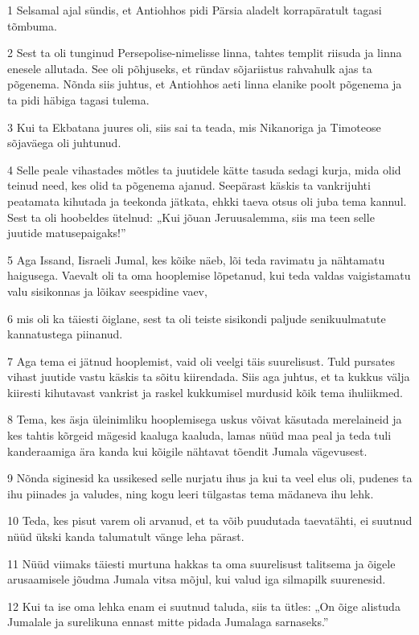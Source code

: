 \par 1 Selsamal ajal sündis, et Antiohhos pidi Pärsia aladelt korrapäratult tagasi tõmbuma.
\par 2 Sest ta oli tunginud Persepolise-nimelisse linna, tahtes templit riisuda ja linna enesele allutada. See oli põhjuseks, et ründav sõjariistus rahvahulk ajas ta põgenema. Nõnda siis juhtus, et Antiohhos aeti linna elanike poolt põgenema ja ta pidi häbiga tagasi tulema.
\par 3 Kui ta Ekbatana juures oli, siis sai ta teada, mis Nikanoriga ja Timoteose sõjaväega oli juhtunud.
\par 4 Selle peale vihastades mõtles ta juutidele kätte tasuda sedagi kurja, mida olid teinud need, kes olid ta põgenema ajanud. Seepärast käskis ta vankrijuhti peatamata kihutada ja teekonda jätkata, ehkki taeva otsus oli juba tema kannul. Sest ta oli hoobeldes ütelnud: „Kui jõuan Jeruusalemma, siis ma teen selle juutide matusepaigaks!”
\par 5 Aga Issand, Iisraeli Jumal, kes kõike näeb, lõi teda ravimatu ja nähtamatu haigusega. Vaevalt oli ta oma hooplemise lõpetanud, kui teda valdas vaigistamatu valu sisikonnas ja lõikav seespidine vaev,
\par 6 mis oli ka täiesti õiglane, sest ta oli teiste sisikondi paljude senikuulmatute kannatustega piinanud.
\par 7 Aga tema ei jätnud hooplemist, vaid oli veelgi täis suurelisust. Tuld pursates vihast juutide vastu käskis ta sõitu kiirendada. Siis aga juhtus, et ta kukkus välja kiiresti kihutavast vankrist ja raskel kukkumisel murdusid kõik tema ihuliikmed.
\par 8 Tema, kes äsja üleinimliku hooplemisega uskus võivat käsutada merelaineid ja kes tahtis kõrgeid mägesid kaaluga kaaluda, lamas nüüd maa peal ja teda tuli kanderaamiga ära kanda kui kõigile nähtavat tõendit Jumala vägevusest.
\par 9 Nõnda siginesid ka ussikesed selle nurjatu ihus ja kui ta veel elus oli, pudenes ta ihu piinades ja valudes, ning kogu leeri tülgastas tema mädaneva ihu lehk.
\par 10 Teda, kes pisut varem oli arvanud, et ta võib puudutada taevatähti, ei suutnud nüüd ükski kanda talumatult vänge leha pärast.
\par 11 Nüüd viimaks täiesti murtuna hakkas ta oma suurelisust talitsema ja õigele arusaamisele jõudma Jumala vitsa mõjul, kui valud iga silmapilk suurenesid.
\par 12 Kui ta ise oma lehka enam ei suutnud taluda, siis ta ütles: „On õige alistuda Jumalale ja surelikuna ennast mitte pidada Jumalaga sarnaseks.”
